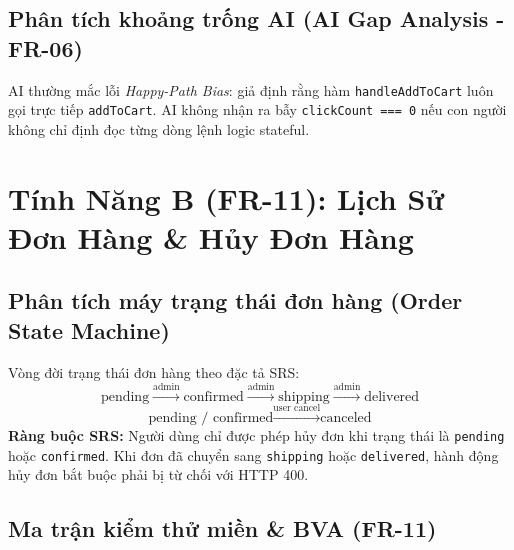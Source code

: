\documentclass[11pt,a4paper]{article}
\begin{document}
\subsection{Phân tích khoảng trống AI (AI Gap Analysis - FR-06)}
AI thường mắc lỗi \textit{Happy-Path Bias}: giả định rằng hàm \texttt{handleAddToCart} luôn gọi trực tiếp \texttt{addToCart}. AI không nhận ra bẫy \texttt{clickCount === 0} nếu con người không chỉ định đọc từng dòng lệnh logic stateful.

\newpage

\section{Tính Năng B (FR-11): Lịch Sử Đơn Hàng \& Hủy Đơn Hàng}

\subsection{Phân tích máy trạng thái đơn hàng (Order State Machine)}
Vòng đời trạng thái đơn hàng theo đặc tả SRS:
$$\text{pending} \xrightarrow{\text{admin}} \text{confirmed} \xrightarrow{\text{admin}} \text{shipping} \xrightarrow{\text{admin}} \text{delivered}$$
$$\text{pending / confirmed} \xrightarrow{\text{user cancel}} \text{canceled}$$
\textbf{Ràng buộc SRS:} Người dùng chỉ được phép hủy đơn khi trạng thái là \texttt{pending} hoặc \texttt{confirmed}. Khi đơn đã chuyển sang \texttt{shipping} hoặc \texttt{delivered}, hành động hủy đơn bắt buộc phải bị từ chối với HTTP 400.

\subsection{Ma trận kiểm thử miền \& BVA (FR-11)}
\end{document}
